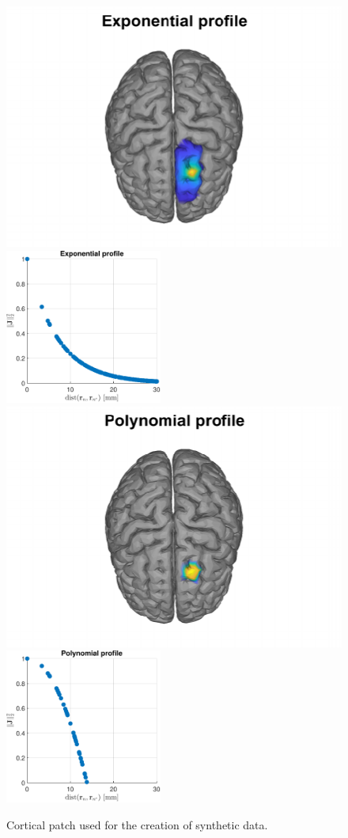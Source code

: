 \begin{figure}
\includegraphics{./img_MATLAB/exp_GroundTruth}
\includegraphics[height=2in]{./img_MATLAB/exp_Profile}
\includegraphics{./img_MATLAB/circ_GroundTruth}
\includegraphics[height=2in]{./img_MATLAB/circ_Profile}
\caption{Cortical patch used for the creation of synthetic data.}
\label{fig:exaple_true}
\end{figure}

